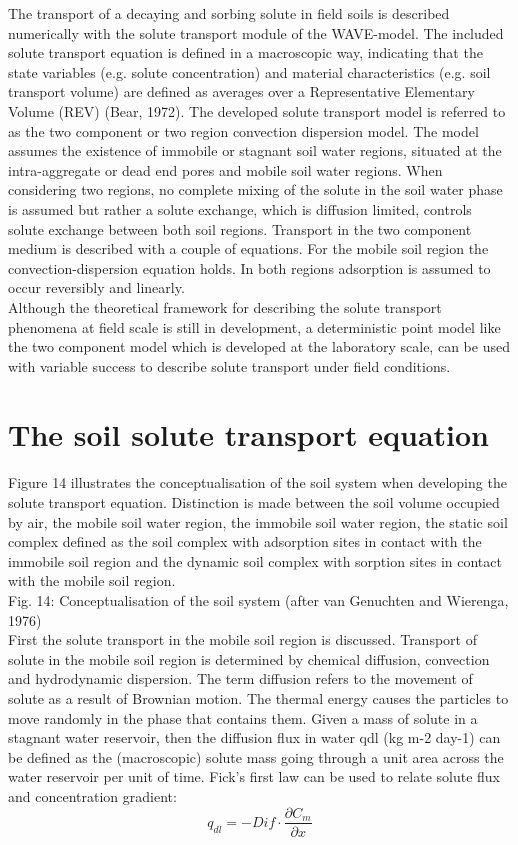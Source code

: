 The transport of a decaying and sorbing solute in field soils is described numerically with the solute transport module of the WAVE-model. The included solute transport equation is defined in a macroscopic way, indicating that the state variables (e.g. solute concentration) and material characteristics (e.g. soil transport volume) are defined as averages over a Representative Elementary Volume (REV) (Bear, 1972). The developed solute transport model is referred to as the two component or two region convection dispersion model. The model assumes the existence of immobile or stagnant soil water regions, situated at the intra-aggregate or dead end pores and mobile soil water regions. When considering two regions, no complete mixing of the solute in the soil water phase is assumed but rather a solute exchange, which is diffusion limited, controls solute exchange between both soil regions. Transport in the two component medium is described with a couple of equations. For the mobile soil region the convection-dispersion equation holds. In both regions adsorption is assumed to occur reversibly and linearly.
\\
Although the theoretical framework for describing the solute transport phenomena at field scale is still in development, a deterministic point model like the two component model which is developed at the laboratory scale, can be used with variable success to describe solute transport under field conditions.

\section{The soil solute transport equation}

Figure 14 illustrates the conceptualisation of the soil system when developing the solute transport equation. Distinction is made between the soil volume occupied by air, the mobile soil water region, the immobile soil water region, the static soil complex defined as the soil complex with adsorption sites in contact with the immobile soil region and the dynamic soil complex with sorption sites in contact with the mobile soil region.
\\
Fig. 14: Conceptualisation of the soil system (after van Genuchten and Wierenga, 1976)
\\
First the solute transport in the mobile soil region is discussed. Transport of solute in the mobile soil region is determined by chemical diffusion, convection and hydrodynamic dispersion. The term diffusion refers to the movement of solute as a result of Brownian motion. The thermal energy causes the particles to move randomly in the phase that contains them. Given a mass of solute in a stagnant water reservoir, then the diffusion flux in water qdl (kg m-2 day-1) can be defined as the (macroscopic) solute mass going through a unit area across the water reservoir per unit of time. Fick's first law can be used to relate solute flux and concentration gradient:
\\
\begin{equation}
q_{dl} = - Dif \cdot \frac{\partial C_m}{\partial x}
\end{equation}

